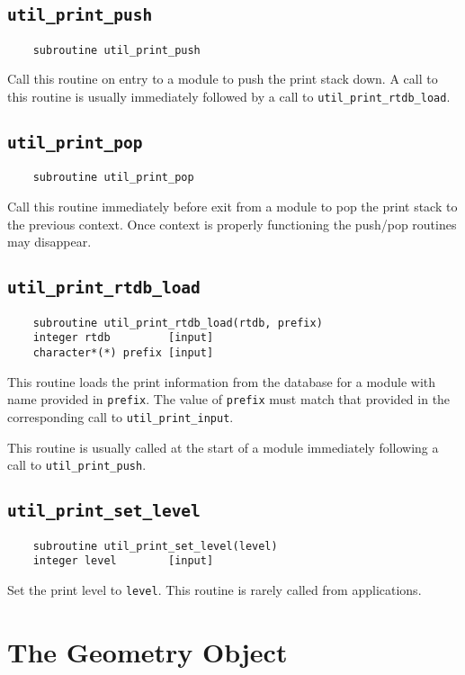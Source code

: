 \subsection{{\tt util\_print\_push}}
\begin{verbatim}
    subroutine util_print_push
\end{verbatim}
Call this routine on entry to a module to push the print stack down.
A call to this routine is usually immediately followed by a call to
\verb+util_print_rtdb_load+. 

\subsection{{\tt util\_print\_pop}}
\begin{verbatim}
    subroutine util_print_pop
\end{verbatim}
Call this routine immediately before exit from a module to pop the
print stack to the previous context.  Once context is properly
functioning the push/pop routines may disappear.

\subsection{{\tt util\_print\_rtdb\_load}}
\begin{verbatim}
    subroutine util_print_rtdb_load(rtdb, prefix)
    integer rtdb         [input]
    character*(*) prefix [input]
\end{verbatim}
This routine loads the print information from the database for a
module with name provided in \verb+prefix+.  The value of
\verb+prefix+ must match that provided in the corresponding call to
\verb+util_print_input+.

This routine is usually called at the start of a module immediately
following a call to \verb+util_print_push+.

\subsection{{\tt util\_print\_set\_level}}
\begin{verbatim}
    subroutine util_print_set_level(level)
    integer level        [input]
\end{verbatim}
Set the print level to {\tt level}.  This routine is rarely called
from applications.

\section{The Geometry Object}

